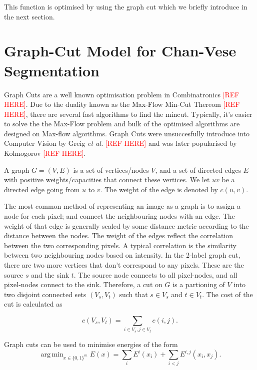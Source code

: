\documentclass[10pt, journal, letterpaper, onecolumn, draftcls]{IEEEtran}
\DeclareMathOperator*{\argmin}{arg\,min}
\begin{document}
This function is optimised by using the graph cut which we briefly introduce in the next section.

\section{Graph-Cut Model for Chan-Vese Segmentation}
\label{sec:CVgraphcut}
Graph Cuts are a well known optimisation problem in Combinatronics \textcolor{red}{[REF HERE]}. Due to the duality known as the Max-Flow Min-Cut Thereom \textcolor{red}{[REF HERE]}, there are several fast algorithms to find the mincut. Typically, it's easier to solve the the Max-Flow problem and bulk of the optimised algorithms are designed on Max-flow algorithms. Graph Cuts were unsuccesfully introduce into Computer Vision by Greig \textit{et al.} \textcolor{red}{[REF HERE]} and was later popularised by Kolmogorov \textcolor{red}{[REF HERE]}.

A graph $G=(V, E)$ is a set of vertices/nodes $V$, and a set of directed edges $E$ with positive weights/capacities that connect these vertices. We let $uv$ be a directed edge going from $u$ to $v$. The weight of the edge is denoted by $c(u, v)$.

The most common method of representing an image as a graph is to assign a node for each pixel; and  connect the neighbouring nodes with an edge. The weight of that edge is generally scaled by some distance metric according to the distance between the nodes. The weight of the edges reflect the correlation between the two corresponding pixels. A typical correlation is the similarity between two neighbouring nodes based on intensity. In the 2-label graph cut, there are two more vertices that don't correspond to any pixels. These are the source $s$ and the sink $t$. The source node connects to all pixel-nodes, and all pixel-nodes connect to the sink. Therefore, a cut on $G$ is a partioning of $V$ into two disjoint connected sets $(V_s, V_t)$ such that $s \in V_s$ and $t \in V_t$. The cost of the cut is calculated as

\begin{equation}
	c(V_s, V_t) = \sum_{i \in V_s, j \in V_t}c(i, j).
\end{equation}

Graph cuts can be used to minimise energies of the form
\begin{equation}
	\argmin_{x \in \{0,1\}^m}	E(x) = \sum_i E^i(x_i) + \sum_{i<j}E^{i,j}(x_i, x_j).
	\label{eq:graphcutenergyform}
\end{equation}
\end{document}
